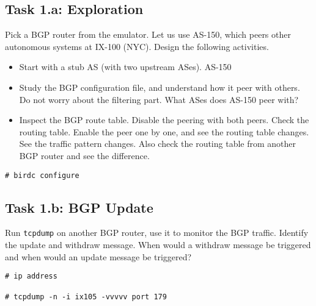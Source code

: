 \subsection{Task 1.a: Exploration} 

Pick a BGP router from the emulator. Let us use AS-150, which
peers other autonomous systems at IX-100 (NYC).
Design the following activities.

\begin{itemize}
  \item Start with a stub AS (with two upstream ASes). AS-150

  \item Study the BGP configuration file, and understand how it
    peer with others. Do not worry about the filtering part.
    What ASes does AS-150 peer with? 

  \item Inspect the BGP route table. Disable the peering with 
    both peers. Check the routing table. Enable the peer one by
    one, and see the routing table changes. See the traffic pattern
    changes. Also check the routing table from another BGP router
    and see the difference. 

\end{itemize}


\begin{lstlisting}
# birdc configure 
\end{lstlisting}
 

\subsection{Task 1.b: BGP Update} 

Run \texttt{tcpdump} on another BGP router, use it to monitor the BGP traffic.
Identify the update and withdraw message. When would a withdraw message be 
triggered and when would an update message be triggered? 


\begin{lstlisting}
# ip address

# tcpdump -n -i ix105 -vvvvv port 179

\end{lstlisting}
 



